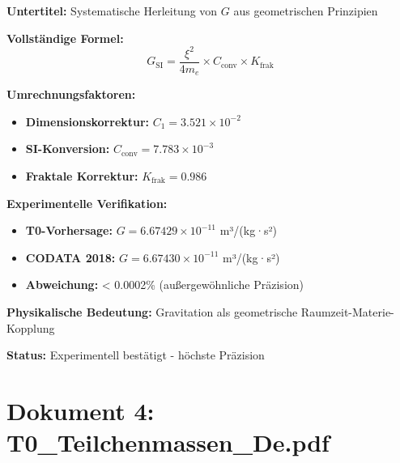 \documentclass[12pt,a4paper]{article}
\newcommand{\xipar}{\xi}
\begin{document}
	\begin{documentbox}
		\textbf{Untertitel:} Systematische Herleitung von $G$ aus geometrischen Prinzipien
		
		\textbf{Vollständige Formel:}
		\begin{equation}
			\boxed{G_{\text{SI}} = \frac{\xipar^2}{4 m_e} \times C_{\text{conv}} \times K_{\text{frak}}}
		\end{equation}
		
		\textbf{Umrechnungsfaktoren:}
		\begin{itemize}
			\item \textbf{Dimensionskorrektur:} $C_1 = 3.521 \times 10^{-2}$ 
			\item \textbf{SI-Konversion:} $C_{\text{conv}} = 7.783 \times 10^{-3}$
			\item \textbf{Fraktale Korrektur:} $K_{\text{frak}} = 0.986$
		\end{itemize}
		
		\textbf{Experimentelle Verifikation:}
		\begin{itemize}
			\item \textbf{T0-Vorhersage:} $G = 6.67429 \times 10^{-11}$ m³/(kg·s²)
			\item \textbf{CODATA 2018:} $G = 6.67430 \times 10^{-11}$ m³/(kg·s²)
			\item \textbf{Abweichung:} < 0.0002\% (außergewöhnliche Präzision)
		\end{itemize}
		
		\textbf{Physikalische Bedeutung:} Gravitation als geometrische Raumzeit-Materie-Kopplung
		
		\textbf{Status:} Experimentell bestätigt - höchste Präzision
	\end{documentbox}
	
	\section{Dokument 4: T0\_Teilchenmassen\_De.pdf}
	
\end{document}

